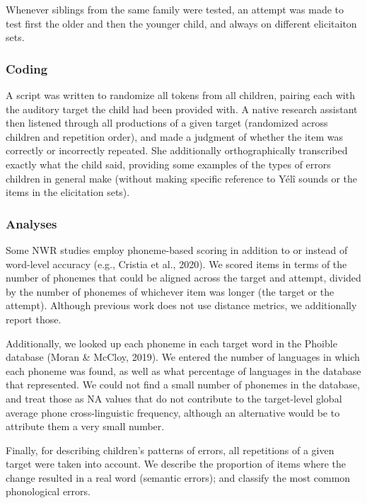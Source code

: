 \documentclass[english,,man,floatsintext]{apa6}
\begin{document}
Whenever siblings from the same family were tested, an attempt was made
to test first the older and then the younger child, and always on
different elicitaiton sets.

\subsubsection{Coding}\label{coding}

A script was written to randomize all tokens from all children, pairing
each with the auditory target the child had been provided with. A native
research assistant then listened through all productions of a given
target (randomized across children and repetition order), and made a
judgment of whether the item was correctly or incorrectly repeated. She
additionally orthographically transcribed exactly what the child said,
providing some examples of the types of errors children in general make
(without making specific reference to Yélî sounds or the items in the
elicitation sets).

\subsubsection{Analyses}\label{analyses}

Some NWR studies employ phoneme-based scoring in addition to or instead
of word-level accuracy (e.g., Cristia et al., 2020). We scored items in
terms of the number of phonemes that could be aligned across the target
and attempt, divided by the number of phonemes of whichever item was
longer (the target or the attempt). Although previous work does not use
distance metrics, we additionally report those.

Additionally, we looked up each phoneme in each target word in the
Phoible database (Moran \& McCloy, 2019). We entered the number of
languages in which each phoneme was found, as well as what percentage of
languages in the database that represented. We could not find a small
number of phonemes in the database, and treat those as NA values that do
not contribute to the target-level global average phone cross-linguistic
frequency, although an alternative would be to attribute them a very
small number.

Finally, for describing children's patterns of errors, all repetitions
of a given target were taken into account. We describe the proportion of
items where the change resulted in a real word (semantic errors); and
classify the most common phonological errors.
\end{document}
